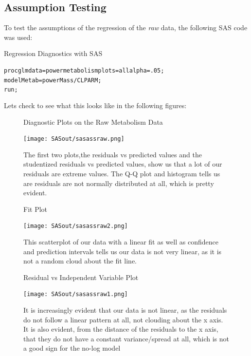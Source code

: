 \documentclass[english]{article}\usepackage[]{graphicx}\usepackage[]{color}
\makeatletter
\newenvironment{kframe}{%
 \def\at@end@of@kframe{}%
 \ifinner\ifhmode%
  \def\at@end@of@kframe{\end{minipage}}%
  \begin{minipage}{\columnwidth}%
 \fi\fi%
 \def\FrameCommand##1{\hskip\@totalleftmargin \hskip-\fboxsep
 \colorbox{shadecolor}{##1}\hskip-\fboxsep
     \hskip-\linewidth \hskip-\@totalleftmargin \hskip\columnwidth}%
 \MakeFramed {\advance\hsize-\width
   \@totalleftmargin\z@ \linewidth\hsize
   \@setminipage}}%
 {\par\unskip\endMakeFramed%
 \at@end@of@kframe}
\newenvironment{knitrout}{}{} %
\makeatother
\begin{document}
\subsection{Assumption Testing}
To test the assumptions of the regression of the \emph{raw} data, the following SAS code was used:
\begin{Code}[H]
	\caption{Regression Diagnostics with SAS}
	\label{cd:SASregdiagraw}
\begin{knitrout}
\color{fgcolor}\begin{kframe}
\begin{alltt}
proc glm data=powermetabolism plots=all alpha=.05;
model Metab=powerMass / CLPARM;
run;
\end{alltt}
\end{kframe}
\end{knitrout}
\end{Code}
Lets check to see what this looks like in the following figures:
\begin{figure}[H]
	\caption{Diagnostic Plots on the Raw Metabolism Data}
	\label{fig:SASdiagraw}
	\begin{center}
		\texttt{[image: SASout/sasassraw.png]}
	\end{center}
\caption*{The first two plots,the residuals vs predicted values and the studentized residuals vs predicted values, show us that a lot of our residuals are extreme values. The Q-Q plot and histogram tells us are residuals are not normally distributed at all, which is pretty evident.}
\end{figure}
\begin{figure}[H]
	\caption{Fit Plot}
	\label{fig:SASfitRaw}
	\begin{center}
		\texttt{[image: SASout/sasassraw2.png]}
	\end{center}
\caption*{This scatterplot of our data with a linear fit as well as confidence and prediction intervals tells us our data is not very linear, as it is not a random cloud about the fit line.}
\end{figure}
\begin{figure}[H]
	\caption{Residual vs Independent Variable Plot}
	\label{fig:SASvarraw}
	\begin{center}
		\texttt{[image: SASout/sasassraw1.png]}
	\end{center}
\caption*{It is increasingly evident that our data is not linear, as the residuals do not follow a linear pattern at all, not clouding about the x axis. It is also evident, from the distance of the residuals to the x axis, that they do not have a constant variance/spread at all, which is not a good sign for the no-log model}
\end{figure}
\end{document}
